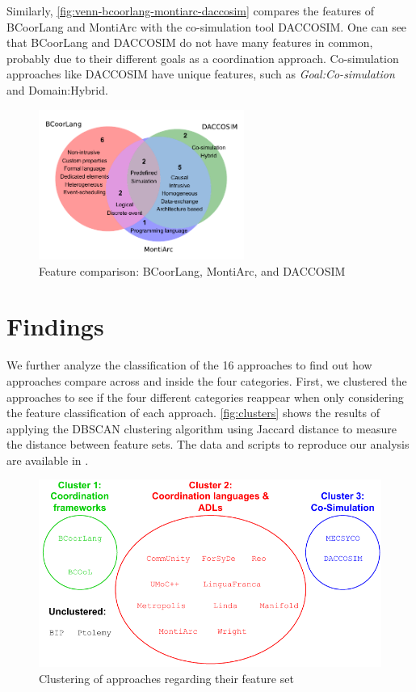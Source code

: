 \documentclass[runningheads]{llncs}
\begin{document}
Similarly, \autoref{fig:venn-bcoorlang-montiarc-daccosim} compares the features of BCoorLang and MontiArc with the co-simulation tool DACCOSIM.
One can see that BCoorLang and DACCOSIM do not have many features in common, probably due to their different goals as a coordination approach.
Co-simulation approaches like DACCOSIM have unique features, such as \textit{Goal:Co-simulation} and \textsf{Domain:Hybrid}.

\begin{figure}[ht]
	\centering
	\includegraphics[width=0.6\textwidth]{images/venn_bcoorlang_montiarc_daccosim}
	\caption{Feature comparison: BCoorLang, MontiArc, and DACCOSIM}
	\label{fig:venn-bcoorlang-montiarc-daccosim}
\end{figure}

\section{Findings} \label{sec:findings}

We further analyze the classification of the 16 approaches to find out how approaches compare across and inside the four categories.
First, we clustered the approaches to see if the four different categories reappear when only considering the feature classification of each approach.
\autoref{fig:clusters} shows the results of applying the DBSCAN clustering algorithm using Jaccard distance to measure the distance between feature sets.
The data and scripts to reproduce our analysis are available in \cite{timkrauterArtifactsCoordination2024}.

\begin{figure}[ht]
	\centering
	\includegraphics[width=1\textwidth]{images/clusters}
	\caption{Clustering of approaches regarding their feature set}
	\label{fig:clusters}
\end{figure}
\end{document}
